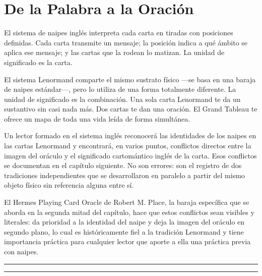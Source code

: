 \section{De la Palabra a la Oración}\label{between-chapters-three-and-four}

El sistema de naipes inglés interpreta cada carta en tiradas con posiciones definidas. Cada carta transmite un mensaje; la posición indica a qué ámbito se aplica ese mensaje; y las cartas que la rodean lo matizan. La unidad de significado es la carta.

El sistema Lenormand comparte el mismo sustrato físico ---se basa en una baraja de naipes estándar---, pero lo utiliza de una forma totalmente diferente. La unidad de significado es la combinación. Una sola carta Lenormand te da un sustantivo sin casi nada más. Dos cartas te dan una oración. El Grand Tableau te ofrece un mapa de toda una vida leída de forma simultánea.

Un lector formado en el sistema inglés reconocerá las identidades de los naipes en las cartas Lenormand y encontrará, en varios puntos, conflictos directos entre la imagen del oráculo y el significado cartomántico inglés de la carta. Esos conflictos se documentan en el capítulo siguiente. No son errores: son el registro de dos tradiciones independientes que se desarrollaron en paralelo a partir del mismo objeto físico sin referencia alguna entre sí.

El Hermes Playing Card Oracle de Robert M. Place, la baraja específica que se aborda en la segunda mitad del capítulo, hace que estos conflictos sean visibles y literales: da prioridad a la identidad del naipe y deja la imagen del oráculo en segundo plano, lo cual es históricamente fiel a la tradición Lenormand y tiene importancia práctica para cualquier lector que aporte a ella una práctica previa con naipes.

\begin{center}\rule{0.5\linewidth}{0.5pt}\end{center}

\begin{center}\rule{0.5\linewidth}{0.5pt}\end{center}
